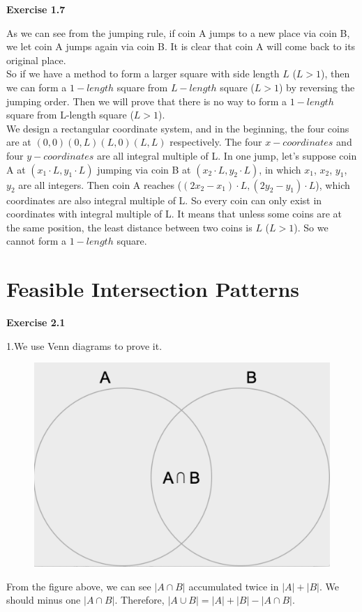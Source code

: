 \documentclass{article} %
\begin{document}
	\textbf{Exercise 1.7}\par
	As we can see from the jumping rule, if coin A jumps to a new place via coin B, we let coin A jumps again via coin B. It is clear that coin A will come back to its original place.\\
	So if we have a method to form a larger square with side length $L$ ($L>1$), then we can form a $1-length$ square from $L-length$ square ($L>1$) by reversing the jumping order. Then we will prove that there is no way to form a $1-length$ square from L-length square ($L>1$).\\
	We design a rectangular coordinate system, and in the beginning, the four coins are at $(0,0) (0,L) (L,0) (L,L)$ respectively. The four $x-coordinates$ and four $y-coordinates$ are all integral multiple of L. In one jump, let's suppose coin A at $(x_1 \cdot L,y_1 \cdot L)$ jumping via coin B at $(x_2 \cdot L,y_2 \cdot L)$, in which $x_1$, $x_2$, $y_1$, $y_2$ are all integers. Then coin A reaches ($(2 x_2-x_1)\cdot L,(2 y_2 - y_1)\cdot L$), which coordinates are also integral multiple of L. So every coin can only exist in coordinates with integral multiple of L. It means that unless some coins are at the same position, the least distance between two coins is $L$ ($L>1$). So we cannot form a $1-length$ square.
	
	
	
	\section{Feasible Intersection Patterns}
	\textbf{Exercise 2.1}\par
	1.We use Venn diagrams to prove it.
	\begin{figure}[H]
		\centering
		\includegraphics[scale=0.06]{IMG_4576.JPG}
		\caption{}
		\label{fig:6}
	\end{figure}
	From the figure above, we can see $|A\cap B|$ accumulated twice in $|A|+|B|$. We should minus one $|A\cap B|$. Therefore, $|A\cup B|=|A|+|B|-|A\cap B|$.\\
	
\end{document}
